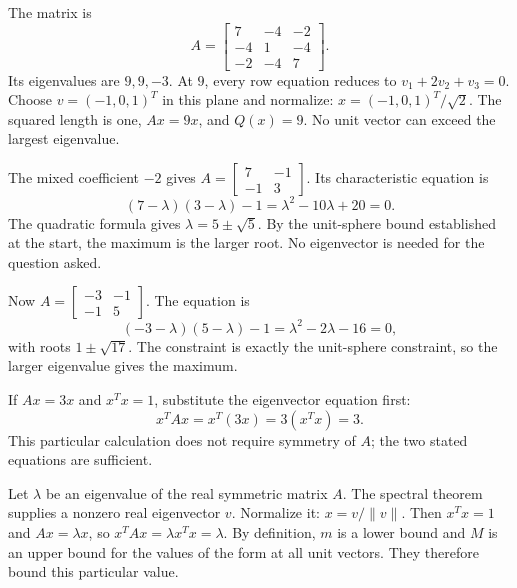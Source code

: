 The matrix is
\[
 A=\begin{bmatrix}7&-4&-2\\-4&1&-4\\-2&-4&7\end{bmatrix}.
\]
Its eigenvalues are $9,9,-3$. At $9$, every row equation reduces to
$v_1+2v_2+v_3=0$. Choose $v=(-1,0,1)^T$ in this plane and normalize:
$x=(-1,0,1)^T/\sqrt2$. The squared length is one, $Ax=9x$,
and $Q(x)=9$. No unit vector can exceed the largest eigenvalue.

The mixed coefficient $-2$ gives
$A=\begin{bmatrix}7&-1\\-1&3\end{bmatrix}$. Its characteristic equation is
\[
 (7-\lambda)(3-\lambda)-1
 =\lambda^2-10\lambda+20=0.
\]
The quadratic formula gives $\lambda=5\pm\sqrt5$.
By the unit-sphere bound established at the start, the maximum is the
larger root. No eigenvector is needed for the question asked.

Now $A=\begin{bmatrix}-3&-1\\-1&5\end{bmatrix}$. The equation is
\[
 (-3-\lambda)(5-\lambda)-1
 =\lambda^2-2\lambda-16=0,
\]
with roots $1\pm\sqrt{17}$. The constraint is exactly the unit-sphere
constraint, so the larger eigenvalue gives the maximum.

If $Ax=3x$ and $x^Tx=1$, substitute the eigenvector equation first:
\[
 x^TAx=x^T(3x)=3(x^Tx)=3.
\]
This particular calculation does not require symmetry of $A$; the two
stated equations are sufficient.

Let $\lambda$ be an eigenvalue of the real symmetric matrix $A$.
The spectral theorem supplies a nonzero real eigenvector $v$. Normalize it:
$x=v/\|v\|$. Then $x^Tx=1$ and $Ax=\lambda x$, so
$x^TAx=\lambda x^Tx=\lambda$. By definition, $m$ is a lower bound
and $M$ is an upper bound for the values of the form at all unit vectors.
They therefore bound this particular value.


